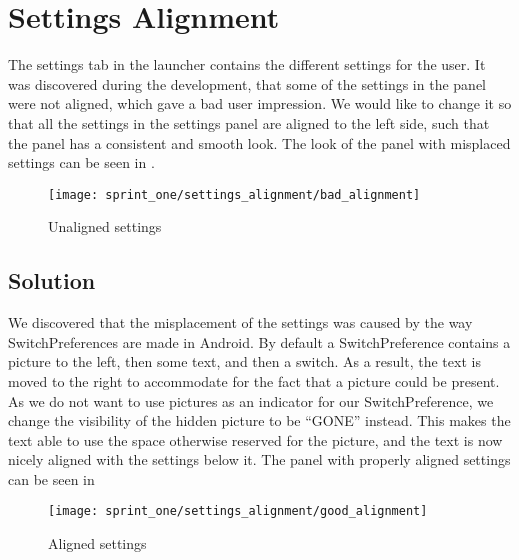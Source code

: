 \section{Settings Alignment}
\label{sec:settings_alignment}

The settings tab in the launcher contains the different settings for the user. It was discovered during the development, that some of the settings in the panel were not aligned, which gave a bad user impression. We would like to change it so that all the settings in the settings panel are aligned to the left side, such that the panel has a consistent and smooth look. The look of the panel with misplaced settings can be seen in .

\begin{figure}[!htbp]
    \centering
    \texttt{[image: sprint\_one/settings\_alignment/bad\_alignment]}
    \caption{Unaligned settings}
    \label{fig:settings_alignment_bad}
\end{figure}

\subsection{Solution} 
\label{sub:settings_alignment_solution}
We discovered that the misplacement of the settings was caused by the way SwitchPreferences are made in Android. By default a SwitchPreference contains a picture to the left, then some text, and then a switch. As a result, the text is moved to the right to accommodate for the fact that a picture could be present. As we do not want to use pictures as an indicator for our SwitchPreference, we change the visibility of the hidden picture to be ``GONE'' instead. This makes the text able to use the space otherwise reserved for the picture, and the text is now nicely aligned with the settings below it. The panel with properly aligned settings can be seen in 

\begin{figure}[!htbp]
    \centering
    \texttt{[image: sprint\_one/settings\_alignment/good\_alignment]}
    \caption{Aligned settings}
    \label{fig:settings_alignment_good}
\end{figure}